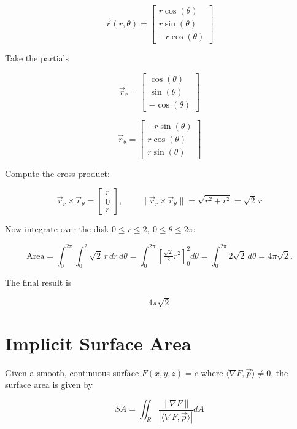\[
    \vec{r}(r, \theta) = 
    \begin{bmatrix}
       r \cos(\theta) \\ 
       r \sin(\theta) \\ 
       - r \cos(\theta)
    \end{bmatrix}
\]

Take the partials 

\[
    \vec{r}_r 
    = 
    \begin{bmatrix}
       \cos(\theta) \\ 
       \sin(\theta) \\ 
       -\cos(\theta)
    \end{bmatrix}
\]

\[
    \vec{r}_{\theta} 
    =
    \begin{bmatrix}
       -r\sin(\theta) \\ 
       r\cos(\theta) \\ 
       r\sin(\theta)
    \end{bmatrix}
\]

Compute the cross product:

\[
    \vec{r}_r \times \vec{r}_{\theta}
    = 
    \begin{bmatrix}
       r \\ 0 \\ r
    \end{bmatrix},
    \qquad
    \bigl\lVert \vec{r}_r \times \vec{r}_\theta \bigr\rVert
    = \sqrt{r^2 + r^2} = \sqrt{2}\,r
\]

Now integrate over the disk \(0 \leq r \leq 2,\ 0 \leq \theta \leq 2\pi\):

\[
    \text{Area} 
    = \int_{0}^{2\pi}\int_{0}^{2} \sqrt{2}\, r \, dr\, d\theta
    = \int_{0}^{2\pi} \left[ \tfrac{\sqrt{2}}{2} r^2 \right]_{0}^{2} d\theta
    = \int_{0}^{2\pi} 2\sqrt{2}\, d\theta
    = 4\pi \sqrt{2}.
\]

The final result is 

\[
    4 \pi \sqrt{2}
\]

\section{Implicit Surface Area}

Given a smooth, continuous surface \(F(x,y,z) = c\) where \(\langle \nabla F , \vec{p} \rangle \neq 0\), the surface area 
is given by 

\[
    SA = \iint_{R} \frac{\|\nabla F\|}{ | \langle \nabla F, \vec{p}\rangle|} dA
\]

